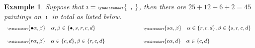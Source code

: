 \documentclass[11pt,a4paper]{amsart}
\numberwithin{equation}{section}
\newtheorem{eg}[thm]{Example}
\theoremstyle{remark}
\let\ytb=\ytableaushort
\newcommand{\tytb}[1]{{\tiny\ytb{#1}}}
\begin{document}
\begin{eg} Suppose that $\imath=\tytb{\ \ ,\  }$, then there are $25+12+6+2=45$ paintings on $\imath$ in total as listed below.
\begin{equation*}\label{eq:sp-nsp.C}
\begin{array}{ll}
   \tytb{\bullet \alpha ,\beta } \quad \alpha, \beta\in \{\bullet, s,r,c,d\} \qquad \qquad  \qquad  & \tytb{s \alpha ,\beta } \quad \alpha\in \{r,c,d\}, \beta\in \{s,r,c,d\} \medskip \medskip \\
     \tytb{r \alpha ,\beta } \quad \alpha\in \{c,d\}, \beta\in \{r,c,d\} \qquad \qquad  \qquad
   &  \tytb{c \alpha , d } \quad  \alpha\in \{c,d\}
     \end{array}
  \end{equation*}

  \end{eg}
\end{document}
